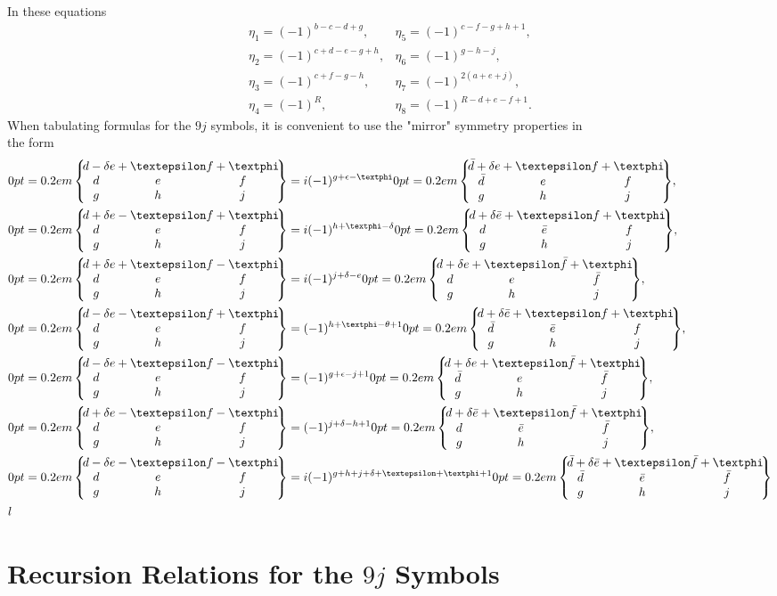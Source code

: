 In these equations
\begin{equation}
\begin{array}{ll}
\eta_{1}=(-1)^{b-c-d+g}, & \eta_{5}=(-1)^{c-f-g+h+1}, \\
\eta_{2}=(-1)^{c+d-e-g+h}, & \eta_{6}=(-1)^{g-h-j}, \\
\eta_{3}=(-1)^{c+f-g-h}, & \eta_{7}=(-1)^{2(a+e+j)}, \\
\eta_{4}=(-1)^{R}, & \eta_{8}=(-1)^{R-d+e-f+1} . \label{eq:10:4:11}
\end{array}
\end{equation}
When tabulating formulas for the $9 j$ symbols, it is convenient to use the "mirror" symmetry properties in\\[0pt]
the form \cite{ref045}
\begin{align}
& \ninej{d-\delta}{e+\varepsilon}{f+\varphi}{d}{e}{f}{g}{h}{j}=i(-1)^{g+\epsilon-\varphi}\ninej{\bar{d}+\delta}{e+\varepsilon}{f+\varphi}{\bar{d}}{e}{f}{g}{h}{j},  \label{eq:10:4:12}\\
& \ninej{d+\delta}{e-\varepsilon}{f+\varphi}{d}{e}{f}{g}{h}{j}=i(-1)^{h+\varphi-\delta}\ninej{d+\delta}{\bar{e}+\varepsilon}{f+\varphi}{d}{\bar{e}}{f}{g}{h}{j},  \label{eq:10:4:13}\\
& \ninej{d+\delta}{e+\varepsilon}{f-\varphi}{d}{e}{f}{g}{h}{j}=i(-1)^{j+\delta-e}\ninej{d+\delta}{e+\varepsilon}{\bar{f}+\varphi}{d}{e}{\bar{f}}{g}{h}{j},  \label{eq:10:4:14}\\
& \ninej{d-\delta}{e-\varepsilon}{f+\varphi}{d}{e}{f}{g}{h}{j}=(-1)^{h+\varphi-\theta+1}\ninej{d+\delta}{\bar{e}+\varepsilon}{f+\varphi}{\bar{d}}{\bar{e}}{f}{g}{h}{j},  \label{eq:10:4:15}\\
& \ninej{d-\delta}{e+\varepsilon}{f-\varphi}{d}{e}{f}{g}{h}{j}=(-1)^{g+\epsilon-j+1}\ninej{d+\delta}{e+\varepsilon}{\bar{f}+\varphi}{\bar{d}}{e}{\bar{f}}{g}{h}{j},  \label{eq:10:4:16}\\
& \ninej{d+\delta}{e-\varepsilon}{f-\varphi}{d}{e}{f}{g}{h}{j}=(-1)^{j+\delta-h+1}\ninej{d+\delta}{\bar{e}+\varepsilon}{\bar{f}+\varphi}{d}{\bar{e}}{\bar{f}}{g}{h}{j},  \label{eq:10:4:17}\\
& \ninej{d-\delta}{e-\varepsilon}{f-\varphi}{d}{e}{f}{g}{h}{j}=i(-1)^{g+h+j+\delta+\varepsilon+\varphi+1}\ninej{\bar{d}+\delta}{\bar{e}+\varepsilon}{\bar{f}+\varphi}{\bar{d}}{\bar{e}}{\bar{f}}{g}{h}{j}  \label{eq:10:4:18}\\
& l \notag
\end{align}
\section{Recursion Relations for the $9 j$ Symbols}\label{sec:10.5}
